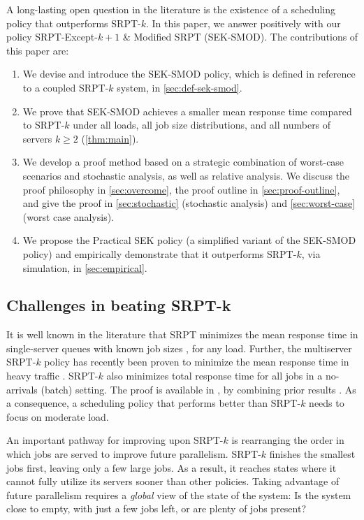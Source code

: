 \documentclass[acmsmall]{acmart}
\begin{document}
A long-lasting open question in the literature is the existence of a scheduling policy that outperforms SRPT-$k$. In this paper, we answer positively with our policy SRPT-Except-$k+1$ \& Modified SRPT (SEK-SMOD). The contributions of this paper are:
\begin{enumerate}[topsep=0pt]
    \item We devise and introduce the SEK-SMOD policy, which is defined in reference to a coupled SRPT-$k$ system, in \cref{sec:def-sek-smod}.
    \item We prove that SEK-SMOD achieves a smaller mean response time compared to SRPT-$k$ under all loads, all job size distributions, and all numbers of servers $k \ge 2$ (\cref{thm:main}).
    \item We develop a proof method based on a strategic combination of worst-case scenarios and stochastic analysis,
    as well as relative analysis. We discuss the proof philosophy in \cref{sec:overcome}, the proof outline in \cref{sec:proof-outline}, and give the proof in \cref{sec:stochastic} (stochastic analysis) and \cref{sec:worst-case} (worst case analysis).
    \item We propose the Practical SEK policy (a simplified variant of the SEK-SMOD policy) and empirically demonstrate that it outperforms SRPT-$k$, via simulation, in \cref{sec:empirical}.
\end{enumerate}
\subsection{Challenges in beating SRPT-k}\label{sec:intro-challenges}

It is well known in the literature that SRPT minimizes the mean response time in single-server queues with known job sizes \cite{schrage1968proof-srpt-opt}, for any load.   Further, the multiserver SRPT-$k$ policy has recently been proven to minimize the mean response time in heavy traffic \cite{grosof-etal-2019-srpt-k}.
SRPT-$k$ also minimizes total response time for all jobs in a no-arrivals (batch) setting.
The proof is available in \cite{graham1979optimization}, by combining prior results \cite{conway1967miller, mcnaughton1959scheduling}.
As a consequence, a scheduling policy that performs better than SRPT-$k$ needs to focus on moderate load.

An important pathway for improving upon SRPT-$k$ is rearranging the order in which jobs are served to improve future parallelism.
SRPT-$k$ finishes the smallest jobs first, leaving only a few large jobs. As a result, it reaches states where it cannot fully utilize its servers sooner than other policies.
Taking advantage of future parallelism requires a \emph{global} view of the state of the system: Is the system close to empty, with just a few jobs left, or are plenty of jobs present?
\end{document}
